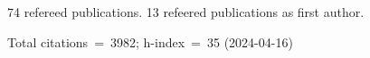 74 refereed publications. 13 refeered publications as first author.

Total citations~=~3982; h-index~=~35 (2024-04-16)